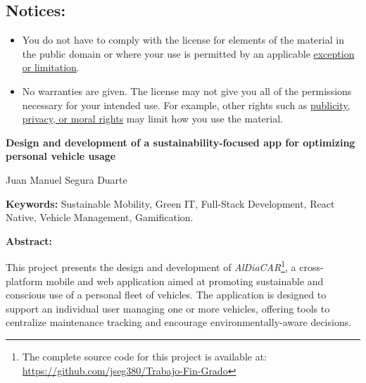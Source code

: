 \begin{tcolorbox}
\vspace{-4mm} %
\section*{\scriptsize\bfseries Notices:}
\vspace{-\baselineskip} %
\begin{itemize}[itemsep=1pt,leftmargin=18pt,partopsep=0pt]
    \item You do not have to comply with the license for elements of the material in the public domain or where your use is permitted by an applicable \href{https://creativecommons.org/licenses/by/4.0/#ref-exception-or-limitation}{exception or limitation}.
    \item No warranties are given. The license may not give you all of the permissions necessary for your intended use. For example, other rights such as \href{https://creativecommons.org/licenses/by/4.0/#ref-publicity-privacy-or-moral-rights}{publicity, privacy, or moral rights} may limit how you use the material.
\end{itemize}
\end{tcolorbox}
\restoregeometry

\clearpage
\mbox{}
\newpage


\clearpage
\mbox{}
\newpage


\begin{center}
    {\large\bfseries Design and development of a sustainability-focused app for optimizing personal vehicle usage}
\end{center}
\begin{center}
    Juan Manuel Segura Duarte
\end{center}

\begin{flushleft}
    \textbf{Keywords:} Sustainable Mobility, Green IT, Full-Stack Development, React Native, Vehicle Management, Gamification.
\end{flushleft}

\begin{flushleft}
    \textbf{Abstract:}
\end{flushleft}

This project presents the design and development of \textit{AlDiaCAR}\footnote{The complete source code for this project is available at: \url{https://github.com/jseg380/Trabajo-Fin-Grado}}, a cross-platform mobile and web application aimed at promoting sustainable and conscious use of a personal fleet of vehicles. The application is designed to support an individual user managing one or more vehicles, offering tools to centralize maintenance tracking and encourage environmentally-aware decisions.

